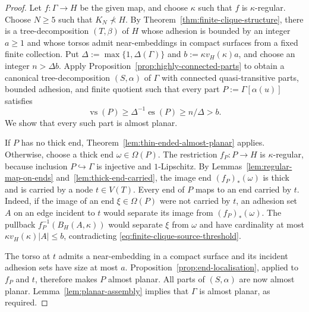 \documentclass[10pt,a4paper]{amsart}
\theoremstyle{definition}
\begin{document}
\begin{proof}
Let $f:\Gamma\to H$ be the given map, and choose $\kappa$ such that $f$ is $\kappa$-regular.
Choose $N\geq5$ such that $K_N\nprec H$.
By Theorem~\ref{thm:finite-clique-structure}, there is a tree-decomposition $(T,\beta)$ of $H$ whose adhesion is bounded by an integer $a\geq1$ and whose torsos admit near-embeddings in compact surfaces from a fixed finite collection.
Put $\Delta:=\max\{1,\Delta(\Gamma)\}$ and $b:=\kappa v_H(\kappa)a$, and choose an integer $n>\Delta b$.
Apply Proposition~\ref{prop:highly-connected-parts} to obtain a canonical tree-decomposition $(S,\alpha)$ of $\Gamma$ with connected quasi-transitive parts, bounded adhesion, and finite quotient such that every part $P:=\Gamma[\alpha(u)]$ satisfies
\begin{equation}\label{eq:finite-clique-source-threshold}
\operatorname{vs}(P)\geq\Delta^{-1}\operatorname{es}(P)\geq n/\Delta>b.
\end{equation}
We show that every such part is almost planar.

If $P$ has no thick end, Theorem~\ref{lem:thin-ended-almost-planar} applies.
Otherwise, choose a thick end $\omega\in\Omega(P)$.
The restriction $f_P:P\to H$ is $\kappa$-regular, because inclusion $P\hookrightarrow\Gamma$ is injective and $1$-Lipschitz.
By Lemmas~\ref{lem:regular-map-on-ends} and~\ref{lem:thick-end-carried}, the image end $(f_P)_*(\omega)$ is thick and is carried by a node $t\in V(T)$.
Every end of $P$ maps to an end carried by $t$.
Indeed, if the image of an end $\xi\in\Omega(P)$ were not carried by $t$, an adhesion set $A$ on an edge incident to $t$ would separate its image from $(f_P)_*(\omega)$.
The pullback $f_P^{-1}(B_H(A,\kappa))$ would separate $\xi$ from $\omega$ and have cardinality at most $\kappa v_H(\kappa)|A|\leq b$, contradicting \eqref{eq:finite-clique-source-threshold}.

The torso at $t$ admits a near-embedding in a compact surface and its incident adhesion sets have size at most $a$.
Proposition~\ref{prop:end-localisation}, applied to $f_P$ and $t$, therefore makes $P$ almost planar.
All parts of $(S,\alpha)$ are now almost planar.
Lemma~\ref{lem:planar-assembly} implies that $\Gamma$ is almost planar, as required.
\end{proof}



\end{document}
